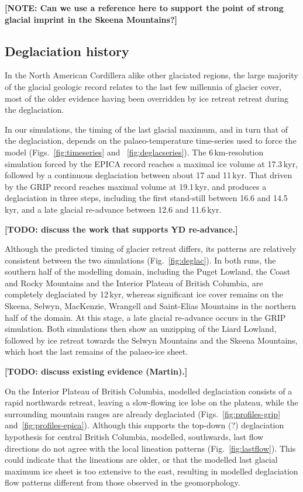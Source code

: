 \documentclass[tc, manuscript]{copernicus}
\newcommand{\note}[1]{\textbf{[NOTE: #1]}}
\newcommand{\todo}[1]{\textbf{[TODO: #1]}}
\begin{document}
\note{Can we use a reference here to support the point of strong glacial
      imprint in the Skeena Mountains?}

\subsection{Deglaciation history}

In the North American Cordillera alike other glaciated regions, the large
majority of the glacial geologic record relates to the last few millennia of
glacier cover, most of the older evidence having been overridden by ice retreat
retreat during the deglaciation.

In our simulations, the timing of the last glacial maximum, and in turn that of
the deglaciation, depends on the palaeo-temperature time-series used to force
the model (Figs.~\ref{fig:timeseries} and ~\ref{fig:deglacseries}). The
6\,km-resolution simulation forced by the EPICA record reaches a maximal
ice volume at 17.3\,kyr, followed by a continuous deglaciation between
about 17 and 11\,kyr. That driven by the GRIP record reaches maximal
volume at 19.1\,kyr, and produces a deglaciation in three steps,
including the first stand-still between 16.6 and 14.5\,kyr, and a late
glacial re-advance between 12.6 and 11.6\,kyr.

\todo{discuss the work that supports YD re-advance.}

Although the predicted timing of glacier retreat differs, its patterns are
relatively consistent between the two simulations (Fig.~\ref{fig:deglac}). In
both runs, the southern half of the modelling domain, including the Puget
Lowland, the Coast and Rocky Mountains and the Interior Plateau of British
Columbia, are completely deglaciated by 12\,kyr, whereas significant
ice cover remains on the Skeena, Selwyn, MacKenzie, Wrangell and Saint-Elias Mountains
in the northern half of the domain. At this stage, a late glacial re-advance
occurs in the GRIP simulation. Both simulations then show an unzipping of the
Liard Lowland, followed by ice retreat towards the Selwyn Mountains and the
Skeena Mountains, which host the last remains of the palaeo-ice sheet.

\todo{discuss existing evidence (Martin).}

On the Interior Plateau of British Columbia, modelled deglaciation consists of
a rapid northwards retreat, leaving a slow-flowing ice lobe on the
plateau, while the surrounding mountain ranges are already deglaciated
(Figs.~\ref{fig:profiles-grip} and~\ref{fig:profiles-epica}). Although this
supports the top-down (?)
deglaciation hypothesis for central British Columbia, modelled, southwards,
last flow directions do not agree with the local lineation patterns
(Fig.~\ref{fig:lastflow}). This could indicate that the lineations are older,
or that the modelled last glacial maximum ice sheet is too extensive to the
east, resulting in modelled deglaciation flow patterns different from those
observed in the geomorphology.
\end{document}
